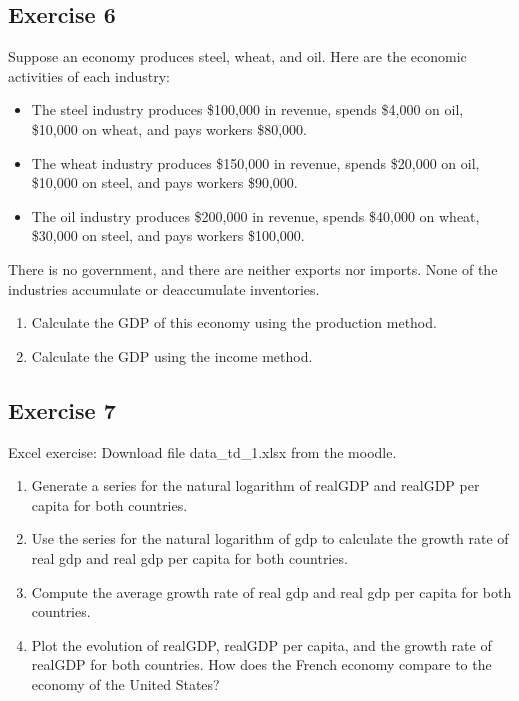 \documentclass[11pt]{article}
\begin{document}
\subsection*{Exercise 6}
Suppose an economy produces steel, wheat, and oil. Here are the economic activities of each industry:
\begin{itemize}
    \item The steel industry produces \$100,000 in revenue, spends \$4,000 on oil, \$10,000 on wheat, and pays workers \$80,000.
    \item The wheat industry produces \$150,000 in revenue, spends \$20,000 on oil, \$10,000 on steel, and pays workers \$90,000.
    \item The oil industry produces \$200,000 in revenue, spends \$40,000 on wheat, \$30,000 on steel, and pays workers \$100,000.
\end{itemize}
There is no government, and there are neither exports nor imports. None of the industries accumulate or deaccumulate inventories.
\begin{enumerate}
    \item Calculate the GDP of this economy using the production method.
    \item Calculate the GDP using the income method.
\end{enumerate}

\subsection*{Exercise 7}
Excel exercise: Download file data\_td\_1.xlsx from the moodle.
\begin{enumerate}
    \item Generate a series for the natural logarithm of realGDP and realGDP per capita for both countries.
    \item Use the series for the natural logarithm of gdp to calculate the growth rate of real gdp and
            real gdp per capita for both countries.
    \item Compute the average growth rate of real gdp and real gdp per capita for both countries.
    \item Plot the evolution of realGDP, realGDP per capita, and the growth rate of realGDP for both countries.
    How does the French economy compare to the economy of the United States?
\end{enumerate}
\end{document}

